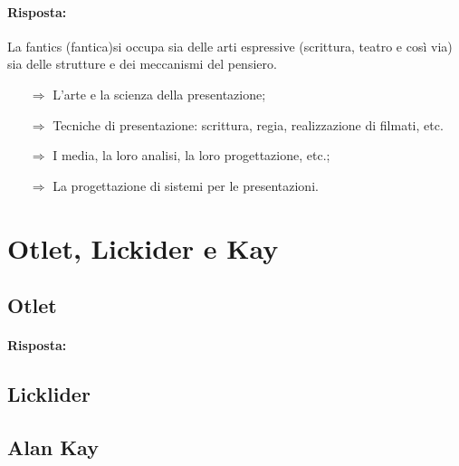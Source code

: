 
\paragraph{Risposta:} La fantics (fantica)si occupa sia delle arti espressive (scrittura, teatro e così via) sia
delle strutture e dei meccanismi del pensiero.

\begin{itemize}
    \item [$\Rightarrow$] L'arte e la scienza della presentazione;
    \item [$\Rightarrow$] Tecniche di presentazione: scrittura, regia, realizzazione di filmati, etc.
    \item [$\Rightarrow$] I media, la loro analisi, la loro progettazione, etc.;
    \item [$\Rightarrow$] La progettazione di sistemi per le presentazioni.
\end{itemize}

\section{Otlet, Lickider e Kay}

\subsection{Otlet}

\qs{}{}

\paragraph{Risposta:}

\subsection{Licklider}

\subsection{Alan Kay}